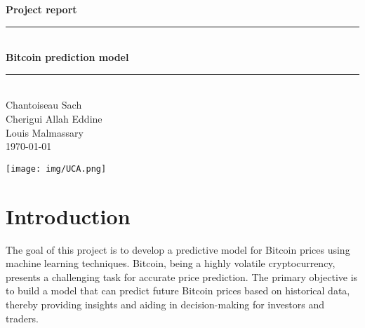 \documentclass{article}
\begin{document}
\begin{titlepage}
    \vspace*{\fill}
    \begin{center}
        \Large \textbf{Project report} \\
        \vspace{0.5cm}
        \rule{\textwidth}{1pt} \\
        \vspace{0.5cm}
        \Huge \textbf{Bitcoin prediction model} \\
        \vspace{0.5cm}
        \rule{\textwidth}{1pt} \\
        \vspace{1cm}
        \Large Chantoiseau Sach\\Cherigui Allah Eddine\\Louis Malmassary\\
        \vspace{1cm}
        \normalsize \today
    \end{center}
    \vspace*{\fill}
    \begin{flushleft}
        \texttt{[image: img/UCA.png]}
    \end{flushleft}
\end{titlepage}

\newpage

\tableofcontents

\newpage

\section{Introduction}
The goal of this project is to develop a predictive model for Bitcoin prices using machine learning techniques. Bitcoin, being a highly volatile cryptocurrency, presents a challenging task for accurate price prediction. The primary objective is to build a model that can predict future Bitcoin prices based on historical data, thereby providing insights and aiding in decision-making for investors and traders.
\end{document}
